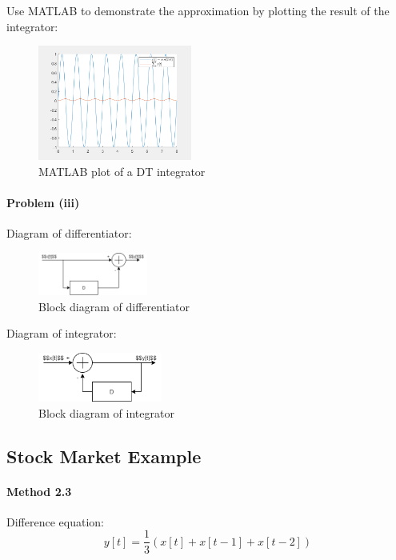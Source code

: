 \documentclass[conference]{IEEEtran}
\begin{document}
Use MATLAB to demonstrate the approximation by plotting the result of the integrator:
\begin{figure}[htpb]
	\begin{center}
		\includegraphics[width=0.45\textwidth]{../matlab/q221_2.png}
		\caption{MATLAB plot of a DT integrator}
		\label{fig:2}
	\end{center}
\end{figure}

\paragraph{Problem (iii)}

Diagram of differentiator:
\begin{figure}[htpb]
	\begin{center}
		\includegraphics[width=0.32\textwidth]{221-dif.png}
		\caption{Block diagram of differentiator}
		\label{fig:3}
	\end{center}
\end{figure}

Diagram of integrator:
\begin{figure}[htpb]
	\begin{center}
		\includegraphics[width=0.36\textwidth]{221-int.png}
		\caption{Block diagram of integrator}
		\label{fig:4}
	\end{center}
\end{figure}
\subsection{Stock Market Example}
\paragraph{Method 2.3}
Difference equation:
\begin{equation}
	y[t]=\frac{1}{3}(x[t]+x[t-1]+x[t-2])
\end{equation}
\end{document}
